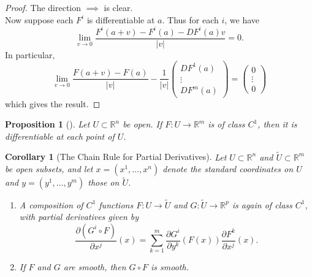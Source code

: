 \documentclass[reqno]{amsart}
\theoremstyle{plain}%
\newtheorem{proposition}[theorem]{Proposition}
\newtheorem{corollary}[theorem]{Corollary}
\theoremstyle{definition}
\theoremstyle{remark}
\begin{document}
        \begin{proof}
        The direction $\implies$ is clear.\\
        Now suppose each $F^{i}$ is differentiable at $a$. Thus for each $i$, we
        have
        \[
        \lim_{v \to 0} \frac{F^{i}(a+v) - F^{i}(a) - DF^{i}(a) v}{\left| v \right|
        }=0.
        \] 
        In particular,
        \[
        \lim_{v \to 0} \frac{F(a+v) - F(a)}{\left| v \right| } -
        \frac{1}{\left| v \right| } \begin{pmatrix} 
            DF^{1}(a) \\
            \vdots \\
            DF^{m}(a)
        \end{pmatrix} = \begin{pmatrix} 
            0 \\
            \vdots \\
            0
        \end{pmatrix} 
        \] 
        which gives the result.
        \end{proof}




        \begin{proposition}[]
        Let $U \subset \mathbb{R}^{n}$ be open. If $F  \colon U \to \mathbb{R}^{m}$ 
        is of class $C^{1}$, then it is differentiable at each point of $U$.
        \end{proposition}

        \begin{corollary}[The Chain Rule for Partial
        Derivatives]\label{chain-rule-partial-derivative}
        Let $U \subset \mathbb{R}^{n}$ and $\tilde{U}
        \subset \mathbb{R}^{m}$ be open subsets, and let
        $x = \left( x^{1},\ldots, x^{n} \right) $ denote the standard coordinates
        on $U$ and $y = \left( y^{1},\ldots, y^{m} \right) $ those on $\tilde{U}$.
        \begin{enumerate}
            \item A composition of $C^{1}$ functions $F  \colon U \to \tilde{U}$ 
                and
                $G  \colon \tilde{U} \to \mathbb{R}^{p}$ is again of class $C^{1}$,
                with partial derivatives given by
                \[
                \frac{\partial \left( G^{i} \circ F \right) }{\partial x^{j}}(x)
                = \sum_{k=1}^{m} \frac{\partial G^{i}}{\partial y^{k}}\left( F(x) \right) 
                \frac{\partial F^{k}}{\partial x^{j}}(x).
                \] 
            \item If $F$ and $G$ are smooth, then $G \circ F$ is smooth.
        \end{enumerate}
        \end{corollary}
\end{document}
